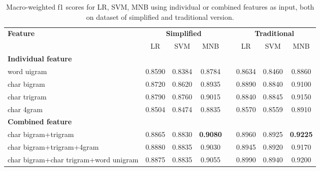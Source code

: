 \documentclass[11pt,a4paper]{article}
\begin{document}
\begin{table}[]
\begin{tabular}{lccclccc}
\hline
\multirow{2}{*}{\textbf{Feature}}     & \multicolumn{3}{c}{\textbf{Simplified}} &  & \multicolumn{3}{c}{\textbf{Traditional}} \\ \cline{2-4} \cline{6-8} 
                                      & LR       & SVM      & MNB               &  & LR        & SVM      & MNB               \\ \hline
\multicolumn{8}{l}{\textbf{Individual feature}}                                                                               \\
word uigram                           & 0.8590   & 0.8384   & 0.8784            &  & 0.8634    & 0.8460   & 0.8860            \\
char bigram                           & 0.8720   & 0.8620   & 0.8935            &  & 0.8890    & 0.8840   & 0.9100            \\
char trigram                          & 0.8790   & 0.8760   & 0.9015            &  & 0.8840    & 0.8845   & 0.9150            \\
char 4gram                            & 0.8504   & 0.8474   & 0.8835            &  & 0.8570    & 0.8559   & 0.8910            \\ \hline
\textbf{Combined feature}             &          &          &                   &  &           &          &                   \\
char bigram+trigram                   & 0.8865   & 0.8830   & \textbf{0.9080}   &  & 0.8960    & 0.8925   & \textbf{0.9225}   \\
char bigram+trigram+4gram             & 0.8880   & 0.8835   & 0.9030            &  & 0.8945    & 0.8920   & 0.9170            \\
char bigram+char trigram+word unigram & 0.8875   & 0.8835   & 0.9055            &  & 0.8990    & 0.8940   & 0.9200            \\ \hline
\end{tabular}
\caption{Macro-weighted f1 scores for LR, SVM, MNB using individual or combined features as input, both on dataset of simplified and traditional version.}
\label{combine_ngram_p}
\end{table}
\end{document}
